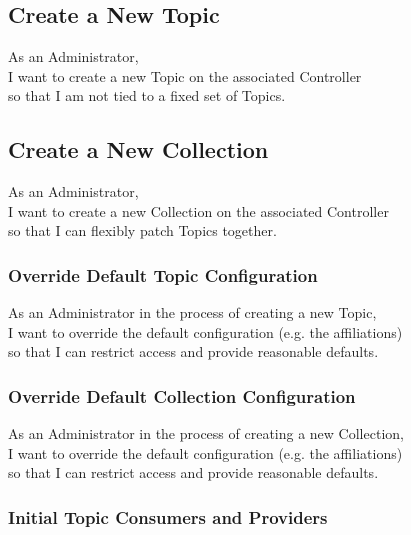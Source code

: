 \subsection{Create a New Topic}\label{sec:create-topic}

As an Administrator,\\
I want to create a new Topic on the associated Controller\\
so that I am not tied to a fixed set of Topics.

\subsection{Create a New Collection}\label{sec:create-collection}

As an Administrator,\\
I want to create a new Collection on the associated Controller\\
so that I can flexibly patch Topics together.

\subsubsection{Override Default Topic Configuration}\label{sec:requirement-topic-default-configuration}

As an Administrator in the process of creating a new Topic,\\
I want to override the default configuration (e.g. the affiliations) \\
so that I can restrict access and provide reasonable defaults.

\subsubsection{Override Default Collection Configuration}\label{sec:requirement-collection-default-configuration}

As an Administrator in the process of creating a new Collection,\\
I want to override the default configuration (e.g. the affiliations) \\
so that I can restrict access and provide reasonable defaults.

\subsubsection{Initial Topic Consumers and Providers}\label{sec:requirement-initial-topic-consumer-provider}

